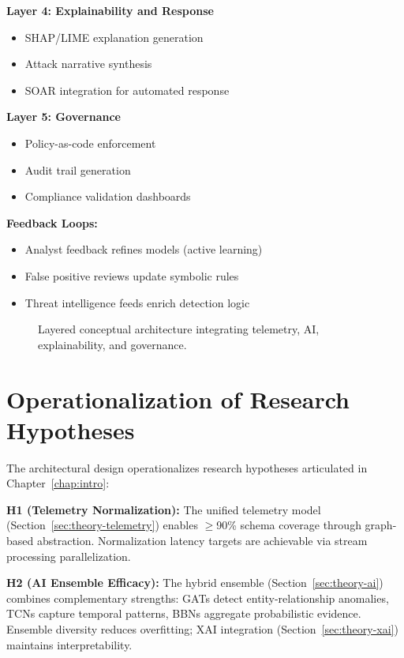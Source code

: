 \textbf{Layer 4: Explainability and Response}
\begin{itemize}
    \item SHAP/LIME explanation generation
    \item Attack narrative synthesis
    \item SOAR integration for automated response
\end{itemize}

\textbf{Layer 5: Governance}
\begin{itemize}
    \item Policy-as-code enforcement
    \item Audit trail generation
    \item Compliance validation dashboards
\end{itemize}

\textbf{Feedback Loops:}
\begin{itemize}
    \item Analyst feedback refines models (active learning)
    \item False positive reviews update symbolic rules
    \item Threat intelligence feeds enrich detection logic
\end{itemize}

\begin{figure}[H]
    \centering
    \caption{Layered conceptual architecture integrating telemetry, AI, explainability, and governance.}
    \label{fig:concept-arch}
\end{figure}

\section{Operationalization of Research Hypotheses}\label{sec:theory-hypotheses}
The architectural design operationalizes research hypotheses articulated in Chapter~\ref{chap:intro}:

\textbf{H1 (Telemetry Normalization):} The unified telemetry model (Section~\ref{sec:theory-telemetry}) enables $\geq$90\% schema coverage through graph-based abstraction. Normalization latency targets are achievable via stream processing parallelization.

\textbf{H2 (AI Ensemble Efficacy):} The hybrid ensemble (Section~\ref{sec:theory-ai}) combines complementary strengths: GATs detect entity-relationship anomalies, TCNs capture temporal patterns, BBNs aggregate probabilistic evidence. Ensemble diversity reduces overfitting; XAI integration (Section~\ref{sec:theory-xai}) maintains interpretability.

